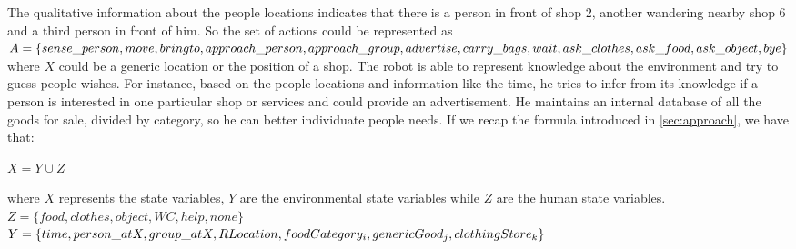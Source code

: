 \documentclass[pdftex,12pt,a4paper]{report}
\begin{document}
\noindent The qualitative information about the people locations indicates that there is a person in front of shop 2, another wandering nearby shop 6 and a third person in front of him. 
\noindent So the set of actions could be represented as \\ 

$A = \{sense\_person, move, bringto, approach\_person, approach\_group, advertise, \\ 
       carry\_bags, wait, ask\_clothes, ask\_food, ask\_object, bye\}$\\ 

where $X$ could be a generic location or the position of a shop.
\noindent The robot is able to represent knowledge about the environment and try to guess people wishes.
For instance, based on the people locations and information like the time, he tries to infer from its knowledge if a person is interested in one particular shop or services and could provide an advertisement. 
He maintains an internal database of all the goods for sale, divided by category, so he can better individuate people needs.
If we recap the formula introduced in \ref{sec:approach}, we have that: \\

\centerline{$X = Y \cup Z$}

\noindent where $X$ represents the state variables, $Y$ are the environmental state variables while $Z$ are the  human state variables. \\

\noindent $Z = \{food, clothes, object, WC, help, none\}$\\
\noindent $Y = \{time, person\_atX, group\_atX, RLocation, foodCategory_i, genericGood_j, \\ clothingStore_k \}$\\
\end{document}
